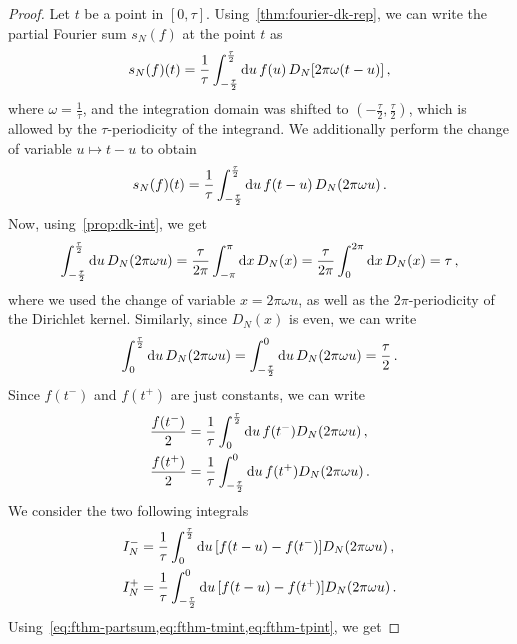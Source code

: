 \begin{proof}
	Let $t$ be a point in $[0,\tau]$. Using~\cref{thm:fourier-dk-rep}, we can write the
	partial Fourier sum $s_N(f)$ at the point $t$ as
	\begin{equation}
		s_N(f)(t)=\frac{1}{\tau}\int_{-\frac{\tau}{2}}^{\frac{\tau}{2}}\mathrm{d} u\,
		f(u)\,D_N[2\pi\omega(t-u)]\,,
	\end{equation}
	where $\omega=\frac{1}{\tau}$, and the integration domain was shifted to
	$(-\frac{\tau}{2},\frac{\tau}{2})$, which is allowed by the $\tau$-periodicity of the
	integrand. We additionally perform the change of variable $u\mapsto t-u$ to obtain
	\begin{equation}
		s_N(f)(t)=\frac{1}{\tau}\int_{-\frac{\tau}{2}}^{\frac{\tau}{2}}\mathrm{d} u\,
		f(t-u)\,D_N(2\pi\omega u)\,.
	\end{equation}
	Now, using~\cref{prop:dk-int}, we get
	\begin{equation}
		\int_{-\frac{\tau}{2}}^{\frac{\tau}{2}}\mathrm{d} u\,D_N(2\pi\omega u)
		=\frac{\tau}{2\pi}\int_{-\pi}^{\pi}\mathrm{d} x\,D_N(x)=
		\frac{\tau}{2\pi}\int_{0}^{2\pi}\mathrm{d} x\,D_N(x)=\tau\,,
		\label{eq:fthm-partsum}
	\end{equation}
	where we used the change of variable $x=2\pi\omega u$, as well as the $2\pi$-periodicity
	of the Dirichlet kernel. Similarly, since $D_N(x)$ is even, we can write
	\begin{equation}
		\int_{0}^{\frac{\tau}{2}}\mathrm{d} u\,D_N(2\pi\omega u)
		=\int_{-\frac{\tau}{2}}^{0}\mathrm{d} u\,D_N(2\pi\omega u)=\frac{\tau}{2}\,.
	\end{equation}
	Since $f(t^-)$ and $f(t^+)$ are just constants, we can write
	\begin{align}
		\frac{f(t^-)}{2} & =\frac{1}{\tau}\int_{0}^{\frac{\tau}{2}}\mathrm{d} u\,
		f(t^-)D_N(2\pi\omega u)\,,
		\label{eq:fthm-tmint}                                                 \\
		\frac{f(t^+)}{2} & =\frac{1}{\tau}\int_{-\frac{\tau}{2}}^{0}\mathrm{d} u\,
		f(t^+)D_N(2\pi\omega u)\,.
		\label{eq:fthm-tpint}
	\end{align}
	We consider the two following integrals
	\begin{align}
		I^-_N & =\frac{1}{\tau}\int_{0}^{\frac{\tau}{2}}\mathrm{d} u\,
		[f(t-u)-f(t^-)]D_N(2\pi\omega u)\,,                        \\
		I^+_N & =\frac{1}{\tau}\int_{-\frac{\tau}{2}}^{0}\mathrm{d} u\,
		[f(t-u)-f(t^+)]D_N(2\pi\omega u)\,.
	\end{align}
	Using~\cref{eq:fthm-partsum,eq:fthm-tmint,eq:fthm-tpint}, we get

\end{proof}
